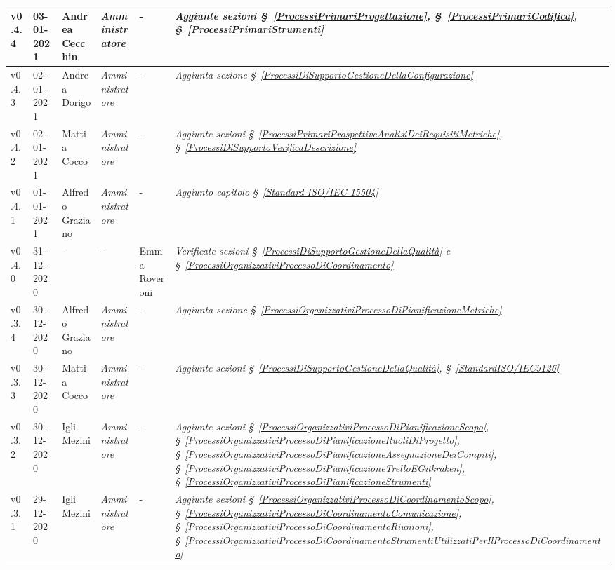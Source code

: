 {\begin{center}
\begin{longtable}[c]{|p{2cm-1\tabcolsep}|p{2cm}|p{3cm-2\tabcolsep}|p{3cm-1.5\tabcolsep}|p{}|p{4cm-2\tabcolsep}|}
		\hline
		\centering v0.4.4 & 03-01-2021 & Andrea Cecchin & \centering \textit{Amministratore} & \centering - & \textit{Aggiunte sezioni \S~\ref{ProcessiPrimariProgettazione}, \S~\ref{ProcessiPrimariCodifica}, \S~\ref{ProcessiPrimariStrumenti}} \\
		\hline
		\centering v0.4.3 & 02-01-2021 & Andrea Dorigo & \centering \textit{Amministratore} & \centering - & \textit{Aggiunta sezione \S~\ref{ProcessiDiSupportoGestioneDellaConfigurazione}} \\
		\hline
		\centering v0.4.2 & 02-01-2021 & Mattia Cocco & \centering \textit{Amministratore} & \centering - & \textit{Aggiunte sezioni \S~\ref{ProcessiPrimariProspettiveAnalisiDeiRequisitiMetriche}, \S~\ref{ProcessiDiSupportoVerificaDescrizione}} \\
		\hline
		\centering v0.4.1 & 01-01-2021 & Alfredo Graziano & \centering \textit{Amministratore} & \centering - & \textit{Aggiunto capitolo \S~\ref{Standard ISO/IEC 15504}} \\
		\hline
		\centering v0.4.0 & 31-12-2020 & \centering - & \centering - & Emma Roveroni & \textit{Verificate sezioni \S~\ref{ProcessiDiSupportoGestioneDellaQualità} e \S~\ref{ProcessiOrganizzativiProcessoDiCoordinamento} }  \\
		\hline
		\centering v0.3.4 & 30-12-2020 & Alfredo Graziano & \centering \textit{Amministratore} & \centering - & \textit{Aggiunta sezione \S~\ref{ProcessiOrganizzativiProcessoDiPianificazioneMetriche}} \\
		\hline
		\centering v0.3.3 & 30-12-2020 & Mattia Cocco & \centering \textit{Amministratore} & \centering - & \textit{Aggiunte sezioni \S~\ref{ProcessiDiSupportoGestioneDellaQualità}, \S~\ref{StandardISO/IEC9126} } \\
		\hline
		\centering v0.3.2 & 30-12-2020 & Igli Mezini & \centering \textit{Amministratore} & \centering - & \textit{Aggiunte sezioni \S~\ref{ProcessiOrganizzativiProcessoDiPianificazioneScopo}, \S~\ref{ProcessiOrganizzativiProcessoDiPianificazioneRuoliDiProgetto}, \S~\ref{ProcessiOrganizzativiProcessoDiPianificazioneAssegnazioneDeiCompiti}, \S~\ref{ProcessiOrganizzativiProcessoDiPianificazioneTrelloEGitkraken}, \S~\ref{ProcessiOrganizzativiProcessoDiPianificazioneStrumenti} } \\
		\hline
		\centering v0.3.1 & 29-12-2020 & Igli Mezini & \centering \textit{Amministratore} & \centering - & \textit{Aggiunte sezioni \S~\ref{ProcessiOrganizzativiProcessoDiCoordinamentoScopo}, \S~\ref{ProcessiOrganizzativiProcessoDiCoordinamentoComunicazione}, \S~\ref{ProcessiOrganizzativiProcessoDiCoordinamentoRiunioni}, \S~\ref{ProcessiOrganizzativiProcessoDiCoordinamentoStrumentiUtilizzatiPerIlProcessoDiCoordinamento} } \\

\end{longtable}
\end{center}}
